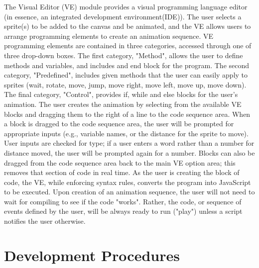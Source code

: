 \documentclass[a4paper]{article}
\begin{document}
The Visual Editor (VE) module provides a visual programming language editor (in essence, an integrated development environment(IDE)).  The user selects a sprite(s) to be added to the canvas and be animated, and the VE allows users to arrange programming elements to create an animation sequence.  VE programming elements are contained in three categories, accessed through one of three drop-down boxes.  The first category, "Method", allows the user to define methods and variables, and includes and end block for the program.  The second category, "Predefined", includes given methods that the user can easily apply to sprites (wait, rotate, move, jump, move right, move left, move up, move down).  The final category, "Control", provides if, while and else blocks for the user's animation.  The user creates the animation by selecting from the available VE blocks and dragging them to the right of a line to the code sequence area.  When a block is dragged to the code sequence area, the user will be prompted for appropriate inputs (e.g., variable names, or the distance for the sprite to move).  User inputs are checked for type; if a user enters a word rather than a number for distance moved, the user will be prompted again for a number.  Blocks can also be dragged from the code sequence area back to the main VE option area; this removes that section of code in real time. As the user is creating the block of code, the VE, while enforcing syntax rules, converts the program into JavaScript to be executed.  Upon creation of an animation sequence, the user will not need to  wait for compiling to see if the code "works". Rather, the code, or sequence of events defined by the user, will be always ready to run ("play") unless a script notifies the user otherwise.






\section{Development Procedures}
\end{document}
